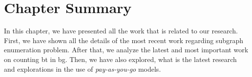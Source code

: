 \section{Chapter Summary}
In this chapter, we have presented all the work that is related to our research.
First, we have shown all the details of the most recent work regarding subgraph enumeration problem. 
After that, we analyze the latest and most important work on counting \acrlong{bt} in \acrlong{bg}.
Then, we have also explored, what is the latest research and explorations in the use of \emph{pay-as-you-go} models.
